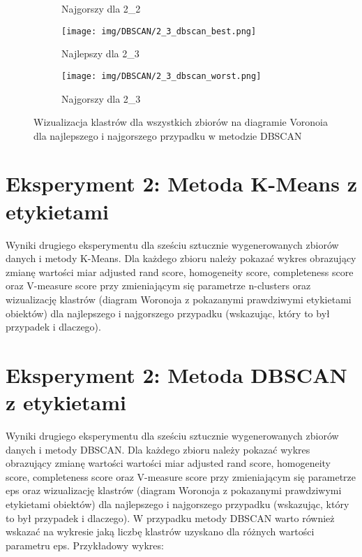 \documentclass[12pt]{article}
\begin{document}
\begin{figure}[H]
\begin{subfigure}[b]{0.24\textwidth}
        \caption{Najgorszy dla 2\_2}
    \end{subfigure}
    \hfill
    \begin{subfigure}[b]{0.24\textwidth}
        \texttt{[image: img/DBSCAN/2\_3\_dbscan\_best.png]}
        \caption{Najlepszy dla 2\_3}
    \end{subfigure}
    \hfill
    \begin{subfigure}[b]{0.24\textwidth}
        \texttt{[image: img/DBSCAN/2\_3\_dbscan\_worst.png]}
        \caption{Najgorszy dla 2\_3}
    \end{subfigure}
    \caption{\centering Wizualizacja klastrów dla wszystkich zbiorów na diagramie Voronoia dla najlepszego i najgorszego przypadku w metodzie DBSCAN}
\end{figure}

\section{Eksperyment 2: Metoda K-Means z etykietami}

Wyniki drugiego eksperymentu dla sześciu sztucznie wygenerowanych zbiorów danych i metody K-Means. Dla każdego zbioru należy pokazać wykres obrazujący zmianę wartości miar adjusted rand score, homogeneity score,  completeness score oraz V-measure score przy zmieniającym się parametrze n-clusters oraz wizualizację klastrów (diagram Woronoja z pokazanymi prawdziwymi etykietami obiektów) dla najlepszego i najgorszego przypadku (wskazując, który to był przypadek i dlaczego). 

\newpage
\section{Eksperyment 2: Metoda DBSCAN z etykietami}

Wyniki drugiego eksperymentu dla sześciu sztucznie wygenerowanych zbiorów danych i metody DBSCAN. Dla każdego zbioru należy pokazać wykres obrazujący zmianę wartości wartości miar adjusted rand score, homogeneity score,  completeness score oraz V-measure score przy zmieniającym się parametrze eps oraz wizualizację klastrów (diagram Woronoja z pokazanymi prawdziwymi etykietami obiektów) dla najlepszego i najgorszego przypadku (wskazując, który to był przypadek i dlaczego). W przypadku metody DBSCAN warto również wskazać na wykresie jaką liczbę klastrów  uzyskano dla różnych wartości parametru eps. Przykładowy wykres:
\end{document}
